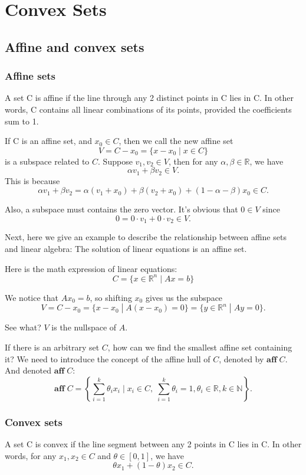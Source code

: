 \documentclass[lang=en,color=blue,mode=fancy,titlestyle=hang]{elegantbook}
\begin{document}
\mainmatter

\chapter{Convex Sets}
\section{Affine and convex sets}
\subsection{Affine sets}
A set C is affine if the line through any 2 distinct points in C lies in C. In other words,
C contains all linear combinations of its points, provided the coefficients sum to 1.

If C is an affine set, and $x_0 \in C$, then we call the new affine set
\[
V = C - x_0 = \{x - x_0 \;|\; x \in C\}
\]
is a subspace related to $C$. Suppose $v_1, v_2 \in V$, then for any
$\alpha, \beta \in \mathbb{R}$, we have
\[
\alpha v_1 + \beta v_2 \in V.
\]
This is because
\[
\alpha v_1 + \beta v_2 = \alpha (v_1 + x_0) + \beta (v_2 + x_0) + (1 - \alpha - \beta)x_0 \in C.
\]

Also, a subspace must contains the zero vector. It's obvious that $0 \in V$ since
\[
0 = 0 \cdot v_1 + 0 \cdot v_2 \in V.
\]

Next, here we give an example to describe the relationship between affine sets and linear
algebra: The solution of linear equations is an affine set.

Here is the math expression of linear equations:
\[
C = \{x \in \mathbb{R}^n \;|\; Ax = b\}
\]

We notice that $Ax_0 = b$, so shifting $x_0$ gives us the subspace
\[
V = C - x_0 = \{x - x_0 \;|\; A(x - x_0) = 0\} = \{y \in \mathbb{R}^n \;|\; Ay = 0\}.
\]

See what? $V$ is the nullspace of $A$.

If there is an arbitrary set $C$, how can we find the smallest affine set containing it?
We need to introduce the concept of the affine hull of $C$, denoted by $\textbf{aff} \; C$.
And denoted $\textbf{aff} \; C$:
\[
\textbf{aff} \; C = \left\{\sum_{i=1}^{k} \theta_i x_i \;|\; x_i \in C, \; \sum_{i=1}^{k} \theta_i = 1, \theta_i \in \mathbb{R}, k \in \mathbb{N}\right\}.
\]

\subsection{Convex sets}
A set C is convex if the line segment between any 2 points in C lies in C. In other words,
for any $x_1, x_2 \in C$ and $\theta \in [0, 1]$, we have
\[
\theta x_1 + (1 - \theta) x_2 \in C.
\]
\end{document}

